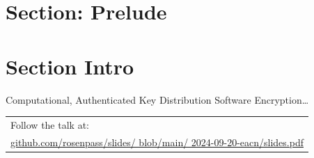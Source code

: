 \section{Section: Prelude}

\section{Section Intro}

\begin{frame}{Computational, Authenticated Key Distribution}
  \small
  Software Encryption…

  \begin{itemize}
  \end{itemize}



	\vfill

    \begin{tabular}[c]{@{\space}l}
    Follow the talk at:\\
    \footnotesize\href{github.com/rosenpass/slides/blob/main/2024-09-20-eacn/slides.pdf}{github.com/rosenpass/slides/ blob/main/ 2024-09-20-eacn/slides.pdf}
    \end{tabular}



\end{frame}



